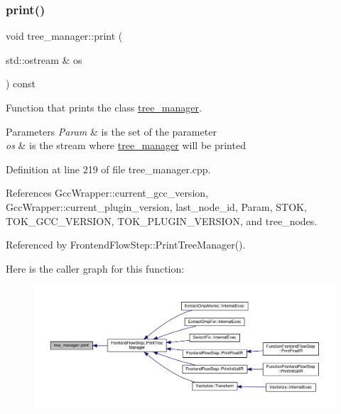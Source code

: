 \subsubsection{\texorpdfstring{print()}{print()}}
{\footnotesize\ttfamily void tree\+\_\+manager\+::print (\begin{DoxyParamCaption}\item[{std\+::ostream \&}]{os }\end{DoxyParamCaption}) const}



Function that prints the class \hyperlink{classtree__manager}{tree\+\_\+manager}. 


\begin{DoxyParams}{Parameters}
{\em Param} & is the set of the parameter \\
\hline
{\em os} & is the stream where \hyperlink{classtree__manager}{tree\+\_\+manager} will be printed \\
\hline
\end{DoxyParams}


Definition at line 219 of file tree\+\_\+manager.\+cpp.



References Gcc\+Wrapper\+::current\+\_\+gcc\+\_\+version, Gcc\+Wrapper\+::current\+\_\+plugin\+\_\+version, last\+\_\+node\+\_\+id, Param, S\+T\+OK, T\+O\+K\+\_\+\+G\+C\+C\+\_\+\+V\+E\+R\+S\+I\+ON, T\+O\+K\+\_\+\+P\+L\+U\+G\+I\+N\+\_\+\+V\+E\+R\+S\+I\+ON, and tree\+\_\+nodes.



Referenced by Frontend\+Flow\+Step\+::\+Print\+Tree\+Manager().

Here is the caller graph for this function\+:
\nopagebreak
\begin{figure}[H]
\begin{center}
\leavevmode
\includegraphics[width=350pt]{d2/ddd/classtree__manager_aabc0b7559aef6d75af506b5023f4d49b_icgraph}
\end{center}
\end{figure}
\mbox{\label{classtree__manager_a580b0289adae5c5d180ceae72ea854fc}} 
